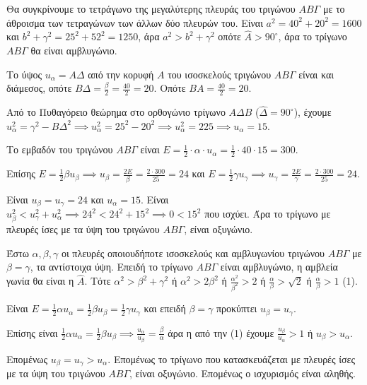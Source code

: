 \begin{alist}
\item[A)] Θα συγκρίνουμε το τετράγωνο της μεγαλύτερης πλευράς του τριγώνου $AB\Gamma$ με το άθροισμα των τετραγώνων των άλλων δύο πλευρών του.
Είναι $a^2 = 40^2 + 20^2 = 1600$ και $b^2 + \gamma^2 = 25^2 + 52^2 = 1250$, άρα $a^2 > b^2 + \gamma^2$ οπότε $\hat{A} > 90^\circ$, άρα το τρίγωνο $AB\Gamma$ θα είναι αμβλυγώνιο.
\item[ii)] Το ύψος $u_\alpha = A\Delta$ από την κορυφή $A$ του ισοσκελούς τριγώνου $AB\Gamma$ είναι και διάμεσος, οπότε $B\Delta = \frac{\beta}{2} = \frac{40}{2} = 20$.
Οπότε $BA = \frac{40}{2} = 20$.

Από το Πυθαγόρειο θεώρημα στο ορθογώνιο τρίγωνο $A\Delta B$ ($\hat{\Delta} = 90^\circ$), έχουμε $u_\alpha^2 = \gamma^2 - B\Delta^2 \implies u_\alpha^2 = 25^2 - 20^2 \implies u_\alpha^2 = 225 \implies u_\alpha = 15$.

Το εμβαδόν του τριγώνου $AB\Gamma$ είναι $E = \frac{1}{2} \cdot \alpha \cdot u_\alpha = \frac{1}{2} \cdot 40 \cdot 15 = 300$.

Επίσης $E = \frac{1}{2} \beta u_\beta \implies u_\beta = \frac{2E}{\beta} = \frac{2 \cdot 300}{25} = 24$ και $E = \frac{1}{2} \gamma u_\gamma \implies u_\gamma = \frac{2E}{\gamma} = \frac{2 \cdot 300}{25} = 24$.
\item[iii)] Είναι $u_\beta = u_\gamma = 24$ και $u_\alpha = 15$.
Είναι $u_\beta^2 < u_\gamma^2 + u_\alpha^2 \implies 24^2 < 24^2 + 15^2 \implies 0 < 15^2$ που ισχύει.
Άρα το τρίγωνο με πλευρές ίσες με τα ύψη του τριγώνου $AB\Gamma$, είναι οξυγώνιο.
\item[β)] Έστω $\alpha, \beta, \gamma$ οι πλευρές οποιουδήποτε ισοσκελούς και αμβλυγωνίου τριγώνου $AB\Gamma$ με $\beta = \gamma$, τα αντίστοιχα ύψη. Επειδή το τρίγωνο $AB\Gamma$ είναι αμβλυγώνιο, η αμβλεία γωνία θα είναι η $\hat{A}$. Τότε $\alpha^2 > \beta^2 + \gamma^2$ ή $\alpha^2 > 2\beta^2$ ή $\frac{\alpha^2}{\beta^2} > 2$ ή $\frac{\alpha}{\beta} > \sqrt{2}$ ή $\frac{\alpha}{\beta} > 1$ (1).

Είναι $E = \frac{1}{2} \alpha u_\alpha = \frac{1}{2} \beta u_\beta = \frac{1}{2} \gamma u_\gamma$ και επειδή $\beta = \gamma$ προκύπτει $u_\beta = u_\gamma$.

Επίσης είναι $\frac{1}{2} \alpha u_\alpha = \frac{1}{2} \beta u_\beta \implies \frac{u_\alpha}{u_\beta} = \frac{\beta}{\alpha}$ άρα η από την (1) έχουμε $\frac{u_\beta}{u_\alpha} > 1$ ή $u_\beta > u_\alpha$.

Επομένως $u_\beta = u_\gamma > u_\alpha$.
Επομένως το τρίγωνο που κατασκευάζεται με πλευρές ίσες με τα ύψη του τριγώνου $AB\Gamma$, είναι οξυγώνιο.
Επομένως ο ισχυρισμός είναι αληθής.
\end{alist}
